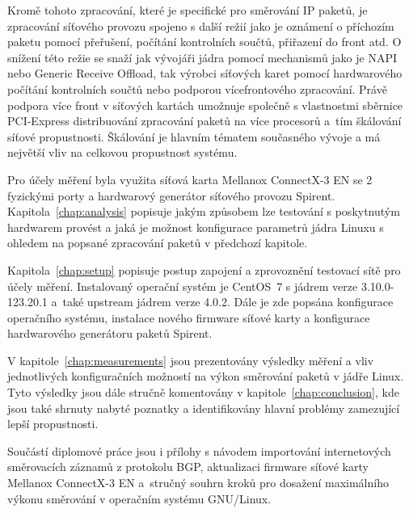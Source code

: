 \documentclass[english]{fitthesis} %
\begin{document}
Kromě tohoto zpracování, které je specifické pro směrování IP paketů, je zpracování síťového provozu
spojeno s další režií jako je oznámení o příchozím paketu pomocí přeřušení,
počítání kontrolních součtů, přiřazení do front atd.
O snížení této režie se snaží jak vývojáři jádra pomocí mechanismů jako je NAPI nebo Generic Receive Offload,
tak výrobci síťových karet pomocí hardwarového počítání kontrolních součtů nebo podporou vícefrontového zpracování.
Právě podpora více front v síťových kartách umožnuje společně s vlastnostmi sběrnice PCI-Express
distribuování zpracování paketů na více procesorů a~tím škálování síťové propustnosti.
Škálování je hlavním tématem současného vývoje a má největší vliv na celkovou propustnost systému.

Pro účely měření byla využita síťová karta Mellanox ConnectX-3 EN se 2 fyzickými porty
a hardwarový generátor síťového provozu Spirent.
Kapitola~\ref{chap:analysis} popisuje jakým způsobem lze testování s poskytnutým hardwarem provést
a jaká je možnost konfigurace parametrů jádra Linuxu s ohledem na popsané zpracování paketů v předchozí kapitole.

Kapitola~\ref{chap:setup} popisuje postup zapojení a zprovoznění testovací sítě pro účely měření.
Instalovaný operační systém je CentOS~7 s jádrem verze 3.10.0-123.20.1 a~také upstream jádrem verze 4.0.2.
Dále je zde popsána konfigurace operačního systému, instalace nového firmware síťové karty a konfigurace hardwarového generátoru
paketů Spirent.

V kapitole~\ref{chap:measurements} jsou prezentovány výsledky měření a vliv jednotlivých konfiguračních možností
na výkon směrování paketů v jádře Linux.
Tyto výsledky jsou dále stručně komentovány v kapitole~\ref{chap:conclusion}, kde jsou také shrnuty nabyté poznatky
a identifikovány hlavní problémy zamezující lepší propustnosti.

Součástí diplomové práce jsou i přílohy s návodem importování internetových směrovacích záznamů z protokolu BGP,
aktualizaci firmware síťové karty Mellanox ConnectX-3 EN
a~stručný souhrn kroků pro dosažení maximálního výkonu směrování v operačním systému GNU/Linux.

  \setcounter{tocdepth}{1}
  \tableofcontents
  


\ifczech
  
\else 
  
%  
\fi
  \begin{flushleft}
  \end{flushleft}
  \appendix
  
\end{document}
